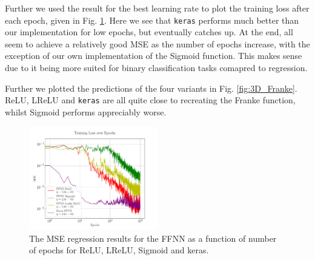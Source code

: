 \documentclass[%
reprint,s
amsmath,amssymb,
aps,
]{revtex4-2}
\begin{document}
Further we used the result for the best learning rate to plot the training loss after each epoch, given in Fig. \ref{fig:NN_Franke_Epochs}. Here we see that \texttt{keras} performs much better than our implementation for low epochs, but eventually catches up. At the end, all seem to achieve a relatively good MSE as the number of epochs increase, with the exception of our own implementation of the Sigmoid function. This makes sense due to it being more suited for binary classification tasks comapred to regression.

Further we plotted the predictions of the four variants in Fig. \ref{fig:3D_Franke}. ReLU, LReLU and \texttt{keras} are all quite close to recreating the Franke function, whilst Sigmoid performs appreciably worse.
\begin{figure}[ht!]
	\includegraphics[width=0.5\textwidth]{Figures/NN_MSE_Franke_Epoch.pdf}
	\caption{The MSE regression results for the FFNN as a function of number of epochs for ReLU, LReLU, Sigmoid and keras.}
	\label{fig:NN_Franke_Epochs}
\end{figure}
\end{document}
